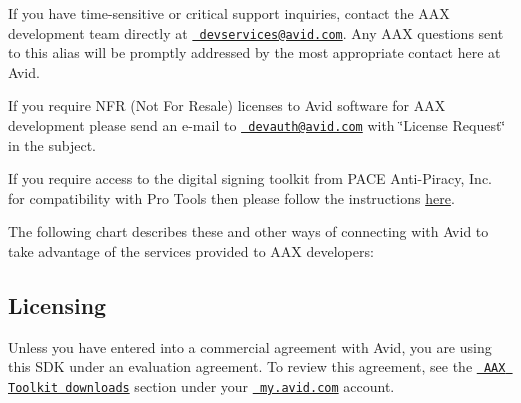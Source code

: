 If you have time-\/sensitive or critical support inquiries, contact the A\+AX development team directly at \href{mailto:devservices@avid.com}{\texttt{ devservices@avid.\+com}}. Any A\+AX questions sent to this alias will be promptly addressed by the most appropriate contact here at Avid.

If you require N\+FR (Not For Resale) licenses to Avid software for A\+AX development please send an e-\/mail to \href{mailto:devauth@avid.com?subject=License Request}{\texttt{ devauth@avid.\+com}} with \char`\"{}\+License Request\char`\"{} in the subject.

If you require access to the digital signing toolkit from P\+A\+CE Anti-\/\+Piracy, Inc. for compatibility with Pro Tools then please follow the instructions \mbox{\hyperlink{a00830_subsection__digital_signature_}{here}}.

The following chart describes these and other ways of connecting with Avid to take advantage of the services provided to A\+AX developers\+:

 \hypertarget{a00793_welcome_licensing}{}\subsection{Licensing}\label{a00793_welcome_licensing}
Unless you have entered into a commercial agreement with Avid, you are using this S\+DK under an evaluation agreement. To review this agreement, see the \href{https://my.avid.com/products/cppsdk?toolkit=AAX}{\texttt{ A\+AX Toolkit downloads}} section under your \href{https://my.avid.com}{\texttt{ my.\+avid.\+com}} account.

